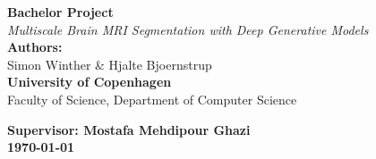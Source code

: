 \documentclass[12pt]{article}
\begin{document}
\begin{titlepage}

  \begin{center}
      \vspace*{7cm}
      {\Huge \textbf{Bachelor Project}} \\[0.8cm]
      {\Large \textit{Multiscale Brain MRI Segmentation with Deep Generative Models}} \\[2cm]
      {\Large \textbf{Authors:}} \\
      Simon Winther \& Hjalte Bjoernstrup \\[1.5cm]
      {\Large \textbf{University of Copenhagen}} \\[0.5cm]
      {\Large Faculty of Science, Department of Computer Science} \\[1.5cm]
  \end{center}
  \vspace*{3.5cm}
  {\textbf{\small Supervisor: Mostafa Mehdipour Ghazi}} \\
  {\textbf{\small \today}}
  \vfill
\end{titlepage}
\end{document}
